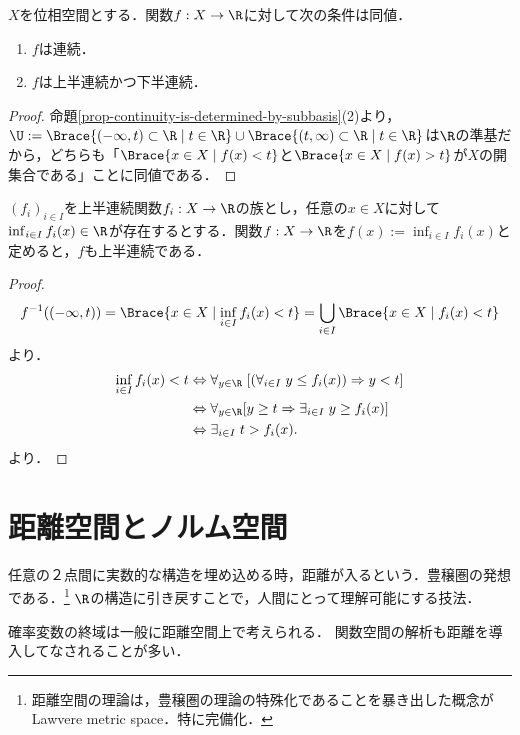\documentclass[uplatex,dvipdfmx]{jsreport}
\begin{document}
\begin{corollary}
    $X$を位相空間とする．関数$f:X\to\R$に対して次の条件は同値．
    \begin{enumerate}
        \item $f$は連続．
        \item $f$は上半連続かつ下半連続．
    \end{enumerate}
\end{corollary}
\begin{proof}
    命題\ref{prop-continuity-is-determined-by-subbasis}(2)より，$\U:=\Brace{(-\infty,t)\subset\R\mid t\in\R}\cup\Brace{(t,\infty)\subset\R\mid t\in\R}$は$\R$の準基だから，どちらも「$\Brace{x\in X\mid f(x)<t}$と$\Brace{x\in X\mid f(x)>t}$が$X$の開集合である」ことに同値である．
\end{proof}

\begin{proposition}[上半連続性の遺伝]
    $(f_i)_{i\in I}$を上半連続関数$f_i:X\to\R$の族とし，任意の$x\in X$に対して$\inf_{i\in I}f_i(x)\in\R$が存在するとする．関数$f:X\to\R$を$f(x):=\inf_{i\in I}f_i(x)$と定めると，$f$も上半連続である．
\end{proposition}
\begin{proof}
    \[f^{-1}((-\infty,t))=\Brace{x\in X\mid \inf_{i\in I}f_i(x)<t}=\bigcup_{i\in I}\Brace{x\in X\mid f_i(x)<t}\]
    より．
    \begin{align*}
        \inf_{i\in I}f_i(x)<t&\Leftrightarrow \forall_{y\in\R}\;[(\forall_{i\in I}\;y\le f_i(x))\Rightarrow y<t]\\
        &\Leftrightarrow \forall_{y\in\R}[y\ge t\Rightarrow\exists_{i\in I}\;y\ge f_i(x)]\\
        &\Leftrightarrow \exists_{i\in I}\;t>f_i(x).
    \end{align*}
    より．
\end{proof}

\section{距離空間とノルム空間}

\begin{tcolorbox}[colframe=ForestGreen, colback=ForestGreen!10!white,breakable,colbacktitle=ForestGreen!40!white,coltitle=black,fonttitle=\bfseries\sffamily,
title=]
    任意の２点間に実数的な構造を埋め込める時，距離が入るという．豊穣圏の発想である．\footnote{距離空間の理論は，豊穣圏の理論の特殊化であることを暴き出した概念がLawvere metric space．特に完備化．}
    $\R$の構造に引き戻すことで，人間にとって理解可能にする技法．

    確率変数の終域は一般に距離空間上で考えられる．
    関数空間の解析も距離を導入してなされることが多い．
\end{tcolorbox}
\end{document}
